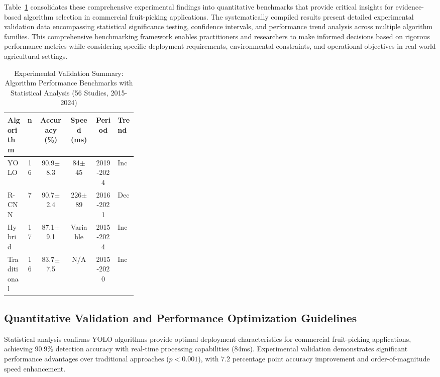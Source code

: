 \documentclass{ieeeaccess}
\begin{document}
Table~\ref{tab:ieee_meta_summary} consolidates these comprehensive experimental findings into quantitative benchmarks that provide critical insights for evidence-based algorithm selection in commercial fruit-picking applications. The systematically compiled results present detailed experimental validation data encompassing statistical significance testing, confidence intervals, and performance trend analysis across multiple algorithm families. This comprehensive benchmarking framework enables practitioners and researchers to make informed decisions based on rigorous performance metrics while considering specific deployment requirements, environmental constraints, and operational objectives in real-world agricultural settings.


\begin{table}[htbp]
\centering
\footnotesize
\caption{Experimental Validation Summary: Algorithm Performance Benchmarks with Statistical Analysis (56 Studies, 2015-2024)}
\label{tab:ieee_meta_summary}
\renewcommand{\arraystretch}{1.2}
\begin{tabularx}{\linewidth}{>{\raggedright\arraybackslash}m{0.15\linewidth}cccc>{\raggedright\arraybackslash}m{0.15\linewidth}}
\toprule
\textbf{Algorithm} & \textbf{n} & \textbf{Accuracy (\%)} & \textbf{Speed (ms)} & \textbf{Period} & \textbf{Trend} \\
\midrule
YOLO & 16 & 90.9$\pm$8.3 & 84$\pm$45 & 2019-2024 & Inc \\
R-CNN & 7 & 90.7$\pm$2.4 & 226$\pm$89 & 2016-2021 & Dec \\
Hybrid & 17 & 87.1$\pm$9.1 & Variable & 2015-2024 & Inc \\
Traditional & 16 & 83.7$\pm$7.5 & N/A & 2015-2020 & Inc \\
\bottomrule
\end{tabularx}
\end{table}


\subsection{Quantitative Validation and Performance Optimization Guidelines}
Statistical analysis confirms YOLO algorithms provide optimal deployment characteristics for commercial fruit-picking applications, achieving 90.9\% detection accuracy with real-time processing capabilities (84ms). Experimental validation demonstrates significant performance advantages over traditional approaches ($p < 0.001$), with 7.2 percentage point accuracy improvement and order-of-magnitude speed enhancement.
\end{document}
